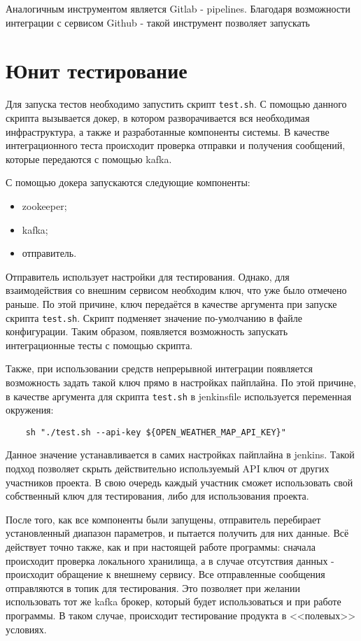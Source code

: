 Аналогичным инструментом является Gitlab - pipelines.
Благодаря возможности интеграции с сервисом Github - такой инструмент позволяет запускать 

\section{Юнит тестирование}

Для запуска тестов необходимо запустить скрипт \texttt{test.sh}.
С помощью данного скрипта вызывается докер, в котором разворачивается вся необходимая инфраструктура, а также и разработанные компоненты системы.
В качестве интеграционного теста происходит проверка отправки и получения сообщений, которые передаются с помощью kafka.

С помощью докера запускаются следующие компоненты:
\begin{itemize}
    \item zookeeper;
    \item kafka;
    \item отправитель.
\end{itemize}

Отправитель использует настройки для тестирования.
Однако, для взаимодействия со внешним сервисом необходим ключ, что уже было отмечено раньше.
По этой причине, ключ передаётся в качестве аргумента при запуске скрипта \texttt{test.sh}.
Скрипт подменяет значение по-умолчанию в файле конфигурации.
Таким образом, появляется возможность запускать интеграционные тесты с помощью скрипта.

Также, при использовании средств непрерывной интеграции появляется возможность задать такой ключ прямо в настройках пайплайна.
По этой причине, в качестве аргумента для скрипта \texttt{test.sh} в jenkinsfile используется переменная окружения:
\begin{lstlisting}
    sh "./test.sh --api-key ${OPEN_WEATHER_MAP_API_KEY}"
\end{lstlisting}

Данное значение устанавливается в самих настройках пайплайна в jenkins.
Такой подход позволяет скрыть действительно используемый API ключ от других участников проекта.
В свою очередь каждый участник сможет использовать свой собственный ключ для тестирования, либо для использования проекта.

После того, как все компоненты были запущены, отправитель перебирает установленный диапазон параметров, и пытается получить для них данные.
Всё действует точно также, как и при настоящей работе программы: сначала происходит проверка локального хранилища, а в случае отсутствия данных - происходит обращение к внешнему сервису.
Все отправленные сообщения отправляются в топик для тестирования.
Это позволяет при желании использовать тот же kafka брокер, который будет использоваться и при работе программы.
В таком случае, происходит тестирование продукта в <<полевых>> условиях.

